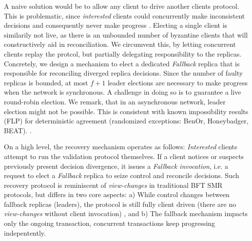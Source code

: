 A naive solution would be to allow any client to drive another clients protocol. This is problematic, since \textit{interested} clients could concurrently make inconsistent decisions and consequently never make progress . Electing a single client is similarily not live, as there is an unbounded number of byzantine clients that will constructively aid in reconciliation. We circumvent this, by letting concurrent clients replay the protcol, but partially delegating responsibility to the replicas. Concretely, we design a mechanism to elect  a dedicated \textit{Fallback} replica that is responsible for reconciling diverged replica decisions. Since the number of faulty replicas is bounded, at most $f+1$ leader elections are necessary to make progress when the network is synchronous. A challenge in doing so is to guarantee a live round-robin election. We remark, that in an asynchronous network, leader election might not be possible. This is consistent with known impossibility results (FLP) \cite{fischer1985impossibility} for deterministic agreement (randomized exceptions: BenOr, Honeybadger, BEAT). . 

On a high level, the recovery mechanism operates as follows: \textit{Interested} clients attempt to run the validation protocol themselves. If a client notices or suspects previously present decision divergence, it issues a \textit{Fallback invocation}, i.e. a request to elect a \textit{Fallback} replica to seize control and reconcile decisions. Such recovery protocol is reminiscent of \textit{view-changes} in traditional BFT SMR protocols, but differs in two core aspects: a) While control changes between fallback replicas (leaders), the protocol is still fully client driven (there are no \textit{view-changes} without client invocation) , and b) The fallback mechanism impacts only the ongoing transaction, concurrent transactions keep progressing indepentently.

